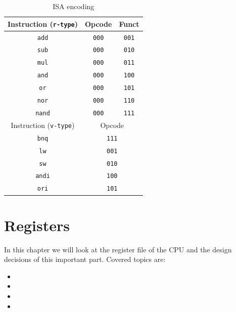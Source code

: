 \documentclass[12pt, dvipsnames, svgnames, x11names, oneside]{book}
\newenvironment{sansserif}{\sffamily}{\normalfont}
\begin{document}
\begin{table}[h]\label{sec:table:isd-encode}
\caption{ISA encoding}
\begin{center}
\begin{tabular}{|c|c|c|}
\hline
Instruction (\texttt{r-type}) & Opcode & Funct \\
\hline
\texttt{add} & \texttt{000} & \texttt{001} \\
\hline
\texttt{sub} & \texttt{000} & \texttt{010} \\
\hline
\texttt{mul} & \texttt{000} & \texttt{011} \\
\hline
\texttt{and} & \texttt{000} & \texttt{100} \\
\hline
\texttt{or} & \texttt{000} & \texttt{101} \\
\hline
\texttt{nor} & \texttt{000} & \texttt{110} \\
\hline
\texttt{nand} & \texttt{000} & \texttt{111} \\
\hline		
\hline
Instruction (\texttt{v-type}) & \multicolumn{2}{|c|}{Opcode} \\
\hline
\texttt{bnq} & \multicolumn{2}{|c|}{\texttt{111}} \\
\hline
\texttt{lw}  & \multicolumn{2}{|c|}{\texttt{001}} \\
\hline
\texttt{sw} & \multicolumn{2}{|c|}{\texttt{010}} \\
\hline
\texttt{andi} & \multicolumn{2}{|c|}{\texttt{100}} \\
\hline
\texttt{ori} & \multicolumn{2}{|c|}{\texttt{101}} \\
\hline
\end{tabular}
\end{center}
\end{table}

\chapter{Registers}
\begin{sansserif}
In this chapter we will look at the register file of the CPU and the design decisions of this important part. Covered topics are:
\begin{itemize}
\item {}
\item {}
\item {}
\item {}
\end{itemize}
\end{sansserif} 
\end{document}

